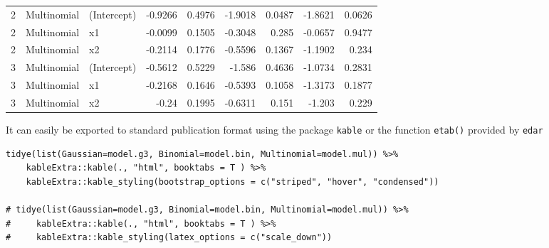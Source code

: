 \documentclass[a4paper]{article}
\begin{document}
\begin{center}
\begin{tabular}{lllrrrrrr}
2 & Multinomial & (Intercept) & -0.9266 & 0.4976 & -1.9018 & 0.0487 & -1.8621 & 0.0626\\
2 & Multinomial & x1 & -0.0099 & 0.1505 & -0.3048 & 0.285 & -0.0657 & 0.9477\\
2 & Multinomial & x2 & -0.2114 & 0.1776 & -0.5596 & 0.1367 & -1.1902 & 0.234\\
3 & Multinomial & (Intercept) & -0.5612 & 0.5229 & -1.586 & 0.4636 & -1.0734 & 0.2831\\
3 & Multinomial & x1 & -0.2168 & 0.1646 & -0.5393 & 0.1058 & -1.3173 & 0.1877\\
3 & Multinomial & x2 & -0.24 & 0.1995 & -0.6311 & 0.151 & -1.203 & 0.229\\
\end{tabular}
\end{center}



It can easily be exported to standard publication format using the package \texttt{kable} or the function \texttt{etab()} provided by \texttt{edar}

\lstset{numbers=left,language=r,label= ,caption= ,captionpos=b}
\begin{lstlisting}
tidye(list(Gaussian=model.g3, Binomial=model.bin, Multinomial=model.mul)) %>%
    kableExtra::kable(., "html", booktabs = T ) %>%
    kableExtra::kable_styling(bootstrap_options = c("striped", "hover", "condensed"))

# tidye(list(Gaussian=model.g3, Binomial=model.bin, Multinomial=model.mul)) %>%
#     kableExtra::kable(., "html", booktabs = T ) %>%
#     kableExtra::kable_styling(latex_options = c("scale_down"))

\end{lstlisting}
\end{document}
